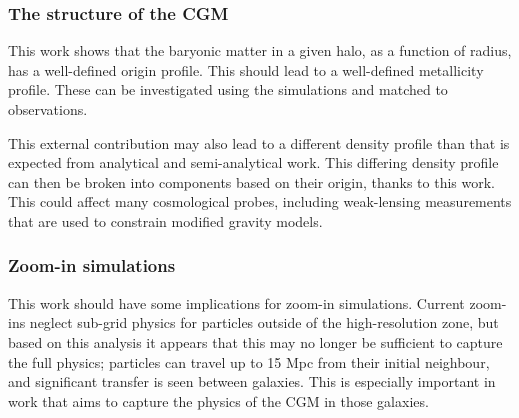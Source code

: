 \subsubsection{The structure of the CGM}

This work shows that the baryonic matter in a given halo, as a function of
radius, has a well-defined origin profile. This should lead to a well-defined
metallicity profile. These can be investigated using the \simba{} simulations
and matched to observations.

This external contribution may also lead to a different density profile than
that is expected from analytical and semi-analytical work. This differing
density profile can then be broken into components based on their origin,
thanks to this work. This could affect many cosmological probes, including
weak-lensing measurements that are used to constrain modified gravity models.

\subsubsection{Zoom-in simulations}

This work should have some implications for zoom-in simulations. Current zoom-ins
neglect sub-grid physics for particles outside of the high-resolution zone,
but based on this analysis it appears that this may no longer be sufficient
to capture the full physics; particles can travel up to 15 Mpc from their
initial neighbour, and significant transfer is seen between galaxies. This is
especially important in work that aims to capture the physics of the CGM in
those galaxies.
